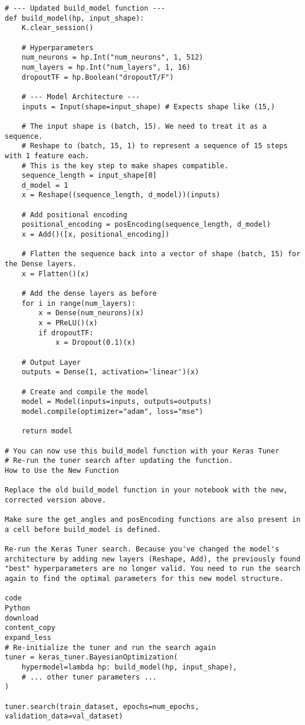 \documentclass{article}
\begin{document}
\begin{verbatim}
# --- Updated build_model function ---
def build_model(hp, input_shape):
    K.clear_session()
    
    # Hyperparameters
    num_neurons = hp.Int("num_neurons", 1, 512)
    num_layers = hp.Int("num_layers", 1, 16)
    dropoutTF = hp.Boolean("dropoutT/F")

    # --- Model Architecture ---
    inputs = Input(shape=input_shape) # Expects shape like (15,)

    # The input shape is (batch, 15). We need to treat it as a sequence.
    # Reshape to (batch, 15, 1) to represent a sequence of 15 steps with 1 feature each.
    # This is the key step to make shapes compatible.
    sequence_length = input_shape[0]
    d_model = 1
    x = Reshape((sequence_length, d_model))(inputs)

    # Add positional encoding
    positional_encoding = posEncoding(sequence_length, d_model)
    x = Add()([x, positional_encoding])
    
    # Flatten the sequence back into a vector of shape (batch, 15) for the Dense layers.
    x = Flatten()(x)

    # Add the dense layers as before
    for i in range(num_layers):
        x = Dense(num_neurons)(x)
        x = PReLU()(x)
        if dropoutTF:
            x = Dropout(0.1)(x)

    # Output Layer
    outputs = Dense(1, activation='linear')(x)

    # Create and compile the model
    model = Model(inputs=inputs, outputs=outputs)
    model.compile(optimizer="adam", loss="mse")

    return model

# You can now use this build_model function with your Keras Tuner
# Re-run the tuner search after updating the function.
How to Use the New Function

Replace the old build_model function in your notebook with the new, corrected version above.

Make sure the get_angles and posEncoding functions are also present in a cell before build_model is defined.

Re-run the Keras Tuner search. Because you've changed the model's architecture by adding new layers (Reshape, Add), the previously found "best" hyperparameters are no longer valid. You need to run the search again to find the optimal parameters for this new model structure.

code
Python
download
content_copy
expand_less
# Re-initialize the tuner and run the search again
tuner = keras_tuner.BayesianOptimization(
    hypermodel=lambda hp: build_model(hp, input_shape),
    # ... other tuner parameters ...
)

tuner.search(train_dataset, epochs=num_epochs, validation_data=val_dataset)
\end{verbatim}
\end{document}
